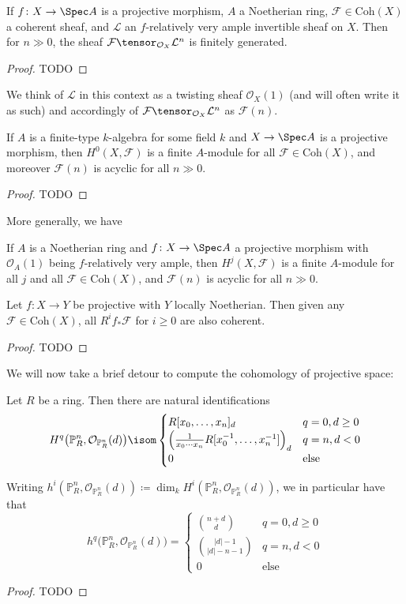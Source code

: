\documentclass[wip, algebra]{bsteffan-lecturenotes}
\newcommand{\cO}{\mathcal{O}}
\newcommand{\cF}{\mathcal{F}}
\newcommand{\cL}{\mathcal{L}}
\renewcommand{\P}{\mathbb{P}}
\newcommand{\Coh}{\mathrm{Coh}}
\begin{document}
\begin{proposition}
	If $f\colon X \to \Spec A$ is a projective morphism, $A$ a Noetherian ring, $\cF \in \Coh(X)$ a coherent sheaf, and $\cL$ an $f$-relatively very ample invertible sheaf on $X$.
	Then for $n \gg 0$, the sheaf $\cF \tensor_{\cO_X} \cL^n$ is finitely generated.
\end{proposition}
\begin{proof}
	TODO
\end{proof}
We think of $\cL$ in this context as a twisting sheaf $\cO_{X}(1)$ (and will often write it as such) and accordingly of $\cF \tensor_{\cO_X} \cL^n$ as $\cF(n)$.
\begin{proposition}
	If $A$ is a finite-type $k$-algebra for some field $k$ and $X \to \Spec A$ is a projective morphism, then $H^0(X, \cF)$ is a finite $A$-module for all $\cF \in \Coh(X)$, and moreover $\cF(n)$ is acyclic for all $n \gg 0$.
\end{proposition}
\begin{proof}
	TODO
\end{proof}
More generally, we have
\begin{theorem}[Serre]
	If $A$ is a Noetherian ring and $f\colon X \to \Spec A$ a projective morphism with $\cO_A(1)$ being $f$-relatively very ample, then $H^j(X, \cF)$ is a finite $A$-module for all $j$ and all $\cF \in \Coh(X)$, and $\cF(n)$ is acyclic for all $n \gg 0$.
\end{theorem}
\begin{corollary}
	Let $f\colon X \to Y$ be projective with $Y$ locally Noetherian.
	Then given any $\cF \in \Coh(X)$, all $R^i f_* \cF$ for $i \geq 0$ are also coherent.
\end{corollary}
\begin{proof}
	TODO
\end{proof}
We will now take a brief detour to compute the cohomology of projective space:
\begin{proposition}
	Let $R$ be a ring. 
	Then there are natural identifications
	\begin{equation*}
		H^q\big(\P^n_R, \cO_{\P^n_R}(d)\big) \isom \begin{cases}
			R[x_0, \ldots, x_n]_d & q = 0, d \geq 0 \\
			\Bigl(\frac{1}{x_0 \cdots x_n} R[x_0^{-1}, \ldots, x_n^{-1}]\Bigr)_d & q = n, d < 0 \\
			0 & \text{else}
		\end{cases}
	\end{equation*}
\end{proposition}
Writing $h^i(\P^n_R, \cO_{\P^n_R}(d)) \coloneq \dim_k H^i(\P^n_R, \cO_{\P^n_R}(d))$, we in particular have that
\begin{equation*}
	h^q\big(\P^n_R, \cO_{\P^n_R}(d)\big) = \begin{cases}
		\binom{n + d}{d} & q = 0, d \geq 0 \\
		\binom{|d| - 1}{|d| - n - 1} & q = n, d < 0 \\
		0 & \text{else}
	\end{cases}
\end{equation*}
\begin{proof}
	TODO
\end{proof}
\end{document}
